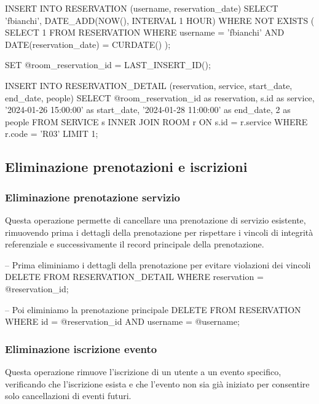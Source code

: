\documentclass[a4paper,12pt]{report}
\begin{document}
\begin{sqlcode}[caption={Query per prenotazione camera}]
INSERT INTO RESERVATION (username, reservation_date)
SELECT 'fbianchi', DATE_ADD(NOW(), INTERVAL 1 HOUR)
WHERE NOT EXISTS (
    SELECT 1 FROM RESERVATION 
    WHERE username = 'fbianchi' 
    AND DATE(reservation_date) = CURDATE()
);

SET @room_reservation_id = LAST_INSERT_ID();

INSERT INTO RESERVATION_DETAIL (reservation, service, start_date, end_date, people)
SELECT 
    @room_reservation_id as reservation,
    s.id as service,
    '2024-01-26 15:00:00' as start_date,
    '2024-01-28 11:00:00' as end_date,
    2 as people
FROM SERVICE s
INNER JOIN ROOM r ON s.id = r.service
WHERE r.code = 'R03'
LIMIT 1;
\end{sqlcode}

\subsection{Eliminazione prenotazioni e iscrizioni}

\subsubsection{Eliminazione prenotazione servizio}
Questa operazione permette di cancellare una prenotazione di servizio esistente, rimuovendo prima i dettagli della prenotazione per rispettare i vincoli di integrità referenziale e successivamente il record principale della prenotazione.

\begin{sqlcode}[caption={Query per eliminazione prenotazione servizio}]
-- Prima eliminiamo i dettagli della prenotazione per evitare violazioni dei vincoli
DELETE FROM RESERVATION_DETAIL 
WHERE reservation = @reservation_id;

-- Poi eliminiamo la prenotazione principale
DELETE FROM RESERVATION 
WHERE id = @reservation_id 
  AND username = @username;
\end{sqlcode}

\subsubsection{Eliminazione iscrizione evento}
Questa operazione rimuove l'iscrizione di un utente a un evento specifico, verificando che l'iscrizione esista e che l'evento non sia già iniziato per consentire solo cancellazioni di eventi futuri.
\end{document}
